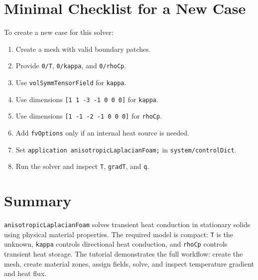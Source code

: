 \documentclass[11pt,a4paper]{article}
\newcommand{\code}[1]{\texttt{#1}}
\begin{document}
\section{Minimal Checklist for a New Case}

To create a new case for this solver:

\begin{enumerate}
    \item Create a mesh with valid boundary patches.
    \item Provide \code{0/T}, \code{0/kappa}, and \code{0/rhoCp}.
    \item Use \code{volSymmTensorField} for \code{kappa}.
    \item Use dimensions \code{[1 1 -3 -1 0 0 0]} for \code{kappa}.
    \item Use dimensions \code{[1 -1 -2 -1 0 0 0]} for \code{rhoCp}.
    \item Add \code{fvOptions} only if an internal heat source is needed.
    \item Set \code{application anisotropicLaplacianFoam;} in
    \code{system/controlDict}.
    \item Run the solver and inspect \code{T}, \code{gradT}, and \code{q}.
\end{enumerate}

\section{Summary}

\code{anisotropicLaplacianFoam} solves transient heat conduction in stationary
solids using physical material properties. The required model is compact:
\code{T} is the unknown, \code{kappa} controls directional heat conduction, and
\code{rhoCp} controls transient heat storage. The tutorial demonstrates the full
workflow: create the mesh, create material zones, assign fields, solve, and
inspect temperature gradient and heat flux.
\end{document}
